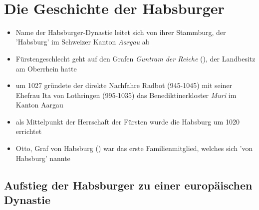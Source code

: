 \documentclass[11pt,a4paper]{article}
\begin{document}
{\bfseries {}}\\[0.75em]

\section*{\textsf{Die Geschichte der Habsburger}}

\begin{itemize}
\item Name der Habsburger-Dynastie leitet sich von ihrer Stammburg, der 'Habsburg' im Schweizer Kanton \textsl{Aargau} ab
\item Fürstengeschlecht geht auf den Grafen \textsl{Guntram der Reiche} (), der Landbesitz am Oberrhein hatte


\item um 1027 gründete der direkte Nachfahre Radbot (945-1045) mit seiner Ehefrau Ita von Lothringen (995-1035) das Benediktinerkloster \textsl{Muri} im Kanton Aargau

\item als Mittelpunkt der Herrschaft der Fürsten wurde die Habsburg um 1020 errichtet

\item Otto, Graf von Habsburg () war das erste Familienmitglied, welches sich 'von Habsburg' nannte

\end{itemize}

\subsection*{\textsf{Aufstieg der Habsburger zu einer europäischen Dynastie}}
\end{document}
